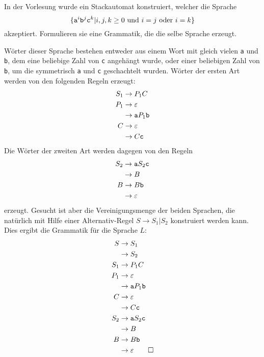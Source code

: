 In der Vorlesung wurde ein Stackautomat konstruiert, welcher die
Sprache
\[
\{{\tt a}^i{\tt b}^j{\tt c}^k|\text{$i,j,k\ge 0$ und $i=j$ oder $i=k$}\}
\]
akzeptiert.
Formulieren sie eine Grammatik, die die selbe Sprache erzeugt.


\begin{loesung}
Wörter dieser Sprache bestehen entweder aus einem Wort mit gleich
vielen {\tt a} und {\tt b}, dem eine beliebige Zahl von {\tt c}
angehängt wurde, oder einer beliebigen Zahl von {\tt b}, um die
symmetrisch {\tt a} und {\tt c} geschachtelt wurden.
Wörter der ersten Art werden von den folgenden Regeln erzeugt:
\begin{align*}
S_1&\to P_1C\\
P_1&\to\varepsilon\\
   &\to {\tt a}P_1{\tt b}\\
C  &\to\varepsilon\\
   &\to C{\tt c}
\end{align*}
Die Wörter der zweiten Art werden dagegen von den Regeln
\begin{align*}
S_2&\to{\tt a}S_2{\tt c}\\
   &\to B\\
B  &\to B{\tt b}\\
   &\to\varepsilon
\end{align*}
erzeugt.
Gesucht ist aber die Vereinigungsmenge der beiden Sprachen, die
natürlich mit Hilfe einer Alternativ-Regel $S\to S_1|S_2$
konstruiert werden kann.
Dies ergibt die Grammatik für die Sprache $L$:
\begin{align*}
S  &\to S_1\\
   &\to S_2\\
S_1&\to P_1C\\
P_1&\to\varepsilon\\
   &\to {\tt a}P_1{\tt b}\\
C  &\to\varepsilon\\
   &\to C{\tt c}\\
S_2&\to{\tt a}S_2{\tt c}\\
   &\to B\\
B  &\to B{\tt b}\\
   &\to\varepsilon
\qedhere
\end{align*}
\end{loesung}
